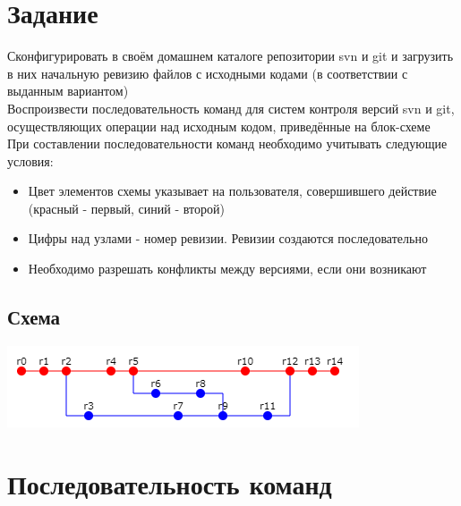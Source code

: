 \documentclass[12pt,a4paper]{article}
\begin{document}
\section{Задание}
Сконфигурировать в своём домашнем каталоге репозитории svn и git и загрузить в них начальную ревизию файлов с исходными кодами (в соответствии с выданным вариантом)
\\ \hfill \break
Воспроизвести последовательность команд для систем контроля версий svn и git, осуществляющих операции над исходным кодом, приведённые на блок-схеме
\\ \hfill \break
При составлении последовательности команд необходимо учитывать следующие условия:
\begin{itemize}
    \item Цвет элементов схемы указывает на пользователя, совершившего действие (красный - первый, синий - второй)
    \item Цифры над узлами - номер ревизии. Ревизии создаются последовательно
    \item Необходимо разрешать конфликты между версиями, если они возникают
\end{itemize}
\subsection{Схема}
\begin{center}
    \includegraphics[width=\textwidth]{scheme.png}
\end{center}
\section{Последовательность команд}
\end{document}
